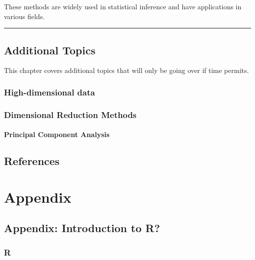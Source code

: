 \documentclass[
  letterpaper,
  DIV=11,
  numbers=noendperiod]{scrreprt}
\begin{document}
These methods are widely used in statistical inference and have
applications in various fields.

\begin{center}\rule{0.5\linewidth}{0.5pt}\end{center}


\chapter{Additional Topics}\label{additional-topics}

This chapter covers additional topics that will only be going over if
time permits.

\section{High-dimensional data}\label{high-dimensional-data}

\section{Dimensional Reduction
Methods}\label{dimensional-reduction-methods}

\subsection{Principal Component
Analysis}\label{principal-component-analysis}


\chapter*{References}\label{references}


\label{refs}

\part{Appendix}

\chapter{Appendix: Introduction to R?}\label{appendix-introduction-to-r}

\section{R}\label{r}
\end{document}
